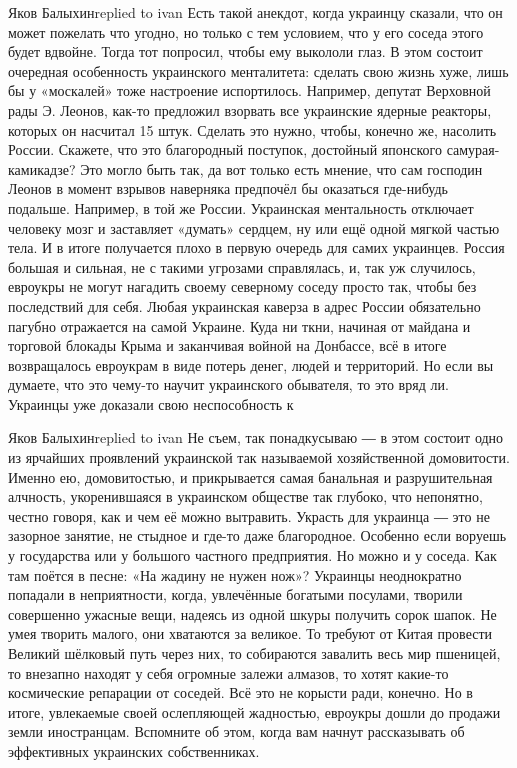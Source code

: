 Яков Балыхинreplied to ivan
Есть такой анекдот, когда украинцу сказали, что он может пожелать что угодно, но только с тем условием, что у его соседа этого будет вдвойне. Тогда тот попросил, чтобы ему выкололи глаз. В этом состоит очередная особенность украинского менталитета: сделать свою жизнь хуже, лишь бы у «москалей» тоже настроение испортилось. Например, депутат Верховной рады Э. Леонов, как-то предложил взорвать все украинские ядерные реакторы, которых он насчитал 15 штук. Сделать это нужно, чтобы, конечно же, насолить России. Скажете, что это благородный поступок, достойный японского самурая-камикадзе? Это могло быть так, да вот только есть мнение, что сам господин Леонов в момент взрывов наверняка предпочёл бы оказаться где-нибудь подальше. Например, в той же России. Украинская ментальность отключает человеку мозг и заставляет «думать» сердцем, ну или ещё одной мягкой частью тела. И в итоге получается плохо в первую очередь для самих украинцев. Россия большая и сильная, не с такими угрозами справлялась, и, так уж случилось, евроукры не могут нагадить своему северному соседу просто так, чтобы без последствий для себя. Любая украинская каверза в адрес России обязательно пагубно отражается на самой Украине. Куда ни ткни, начиная от майдана и торговой блокады Крыма и заканчивая войной на Донбассе, всё в итоге возвращалось евроукрам в виде потерь денег, людей и территорий. Но если вы думаете, что это чему-то научит украинского обывателя, то это вряд ли. Украинцы уже доказали свою неспособность к

Яков Балыхинreplied to ivan
Не съем, так понадкусываю ― в этом состоит одно из ярчайших проявлений украинской так называемой хозяйственной домовитости. Именно ею, домовитостью, и прикрывается самая банальная и разрушительная алчность, укоренившаяся в украинском обществе так глубоко, что непонятно, честно говоря, как и чем её можно вытравить. Украсть для украинца ― это не зазорное занятие, не стыдное и где-то даже благородное. Особенно если воруешь у государства или у большого частного предприятия. Но можно и у соседа. Как там поётся в песне: «На жадину не нужен нож»? Украинцы неоднократно попадали в неприятности, когда, увлечённые богатыми посулами, творили совершенно ужасные вещи, надеясь из одной шкуры получить сорок шапок. Не умея творить малого, они хватаются за великое. То требуют от Китая провести Великий шёлковый путь через них, то собираются завалить весь мир пшеницей, то внезапно находят у себя огромные залежи алмазов, то хотят какие-то космические репарации от соседей. Всё это не корысти ради, конечно. Но в итоге, увлекаемые своей ослепляющей жадностью, евроукры дошли до продажи земли иностранцам. Вспомните об этом, когда вам начнут рассказывать об эффективных украинских собственниках.

